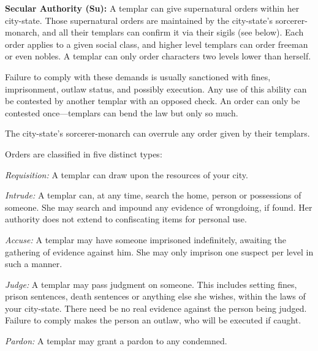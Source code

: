 \textbf{Secular Authority (Su):} A templar can give supernatural orders within her city-state. Those supernatural orders are maintained by the city-state's sorcerer-monarch, and all their templars can confirm it via their sigils (see below). Each order applies to a given social class, and higher level templars can order freeman or even nobles. A templar can only order characters two levels lower than herself.

Failure to comply with these demands is usually sanctioned with fines, imprisonment, outlaw status, and possibly execution. Any use of this ability can be contested by another templar with an opposed  check. An order can only be contested once---templars can bend the law but only so much.

The city-state's sorcerer-monarch can overrule any order given by their templars.

Orders are classified in five distinct types:
\begin{itemize*}
\item \textit{Requisition:} A templar can draw upon the resources of your city.
\item \textit{Intrude:} A templar can, at any time, search the home, person or possessions of someone. She may search and impound any evidence of wrongdoing, if found. Her authority does not extend to confiscating items for personal use.
\item \textit{Accuse:} A templar may have someone imprisoned indefinitely, awaiting the gathering of evidence against him. She may only imprison one suspect per level in such a manner.
\item \textit{Judge:} A templar may pass judgment on someone. This includes setting fines, prison sentences, death sentences or anything else she wishes, within the laws of your city-state. There need be no real evidence against the person being judged. Failure to comply makes the person an outlaw, who will be executed if caught.
\item \textit{Pardon:} A templar may grant a pardon to any condemned.
\end{itemize*}





